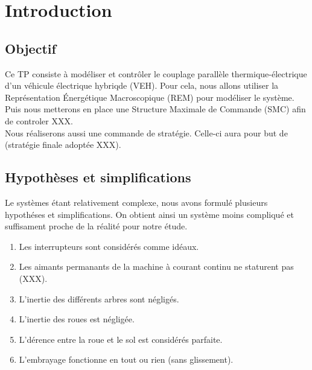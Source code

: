 \section{Introduction}

\subsection{Objectif}

	Ce TP consiste à modéliser et contrôler le couplage parallèle thermique-électrique d'un véhicule électrique hybriqde (VEH). Pour cela, nous allons utiliser la Représentation Énergétique Macroscopique (REM) pour modéliser le système. Puis nous metterons en place une Structure Maximale de Commande (SMC) afin de controler XXX.\\
	Nous réaliserons aussi une commande de stratégie. Celle-ci aura pour but de (stratégie finale adoptée XXX).

\subsection{Hypothèses et simplifications}

	Le systèmes étant relativement complexe, nous avons formulé plusieurs hypothéses et simplifications. On obtient ainsi un système moins compliqué et suffisament proche de la réalité pour notre étude. 

\begin{enumerate} 
\item Les interrupteurs sont considérés comme idéaux.
\item Les aimants permanants de la machine à courant continu ne staturent pas (XXX).
\item L'inertie des différents arbres sont négligés.
\item L'inertie des roues est négligée.
\item L'dérence entre la roue et le sol est considérés parfaite. 
\item L'embrayage fonctionne en tout ou rien (sans glissement).
\end{enumerate}

